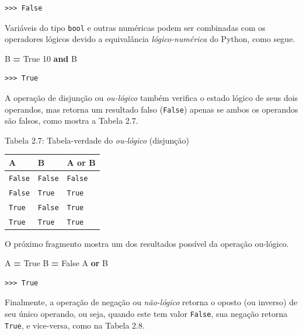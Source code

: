 \documentclass[
]{book}
\newenvironment{Shaded}{\begin{snugshade}}{\end{snugshade}}
\newcommand{\DecValTok}[1]{\textcolor[rgb]{0.00,0.00,0.81}{#1}}
\newcommand{\KeywordTok}[1]{\textcolor[rgb]{0.13,0.29,0.53}{\textbf{#1}}}
\newcommand{\NormalTok}[1]{#1}
\newcommand{\OperatorTok}[1]{\textcolor[rgb]{0.81,0.36,0.00}{\textbf{#1}}}
\newcommand{\VariableTok}[1]{\textcolor[rgb]{0.00,0.00,0.00}{#1}}
\begin{document}
\begin{verbatim}
>>> False
\end{verbatim}

Variáveis do tipo \texttt{bool} e outras numéricas podem ser combinadas com os operadores lógicos devido a equivalância \emph{lógico-numérica} do Python, como segue.

\begin{Shaded}
\begin{Highlighting}[]
\NormalTok{B }\OperatorTok{=} \VariableTok{True}
\DecValTok{10} \KeywordTok{and}\NormalTok{ B}
\end{Highlighting}
\end{Shaded}

\begin{verbatim}
>>> True
\end{verbatim}

A operação de disjunção ou \emph{ou-lógico} também verifica o estado lógico de seus dois operandos, mas retorna um resultado falso (\texttt{False}) apenas se ambos os operandos são falsos, como mostra a Tabela 2.7.

Tabela 2.7: Tabela-verdade do \emph{ou-lógico} (disjunção)

\begin{longtable}[]{@{}lll@{}}
\toprule
A & B & A or B \\
\midrule
\endhead
\texttt{False} & \texttt{False} & \texttt{False} \\
\texttt{False} & \texttt{True} & \texttt{True} \\
\texttt{True} & \texttt{False} & \texttt{True} \\
\texttt{True} & \texttt{True} & \texttt{True} \\
\bottomrule
\end{longtable}

O próximo fragmento mostra um dos resultados possível da operação ou-lógico.

\begin{Shaded}
\begin{Highlighting}[]
\NormalTok{A }\OperatorTok{=} \VariableTok{True}
\NormalTok{B }\OperatorTok{=} \VariableTok{False}
\NormalTok{A }\KeywordTok{or}\NormalTok{ B}
\end{Highlighting}
\end{Shaded}

\begin{verbatim}
>>> True
\end{verbatim}

Finalmente, a operação de negação ou \emph{não-lógico} retorna o oposto (ou inverso) de seu único operando, ou seja, quando este tem valor \texttt{False}, sua negação retorna \texttt{True}, e vice-versa, como na Tabela 2.8.
\end{document}
